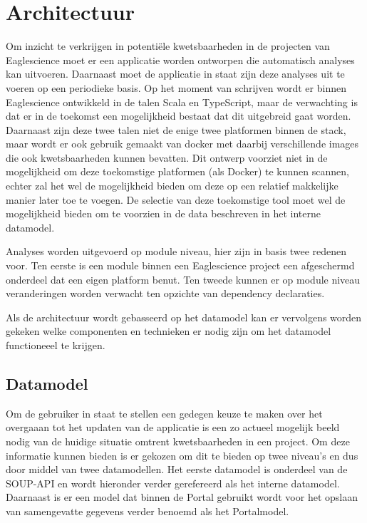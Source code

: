 \chapter{Architectuur}\label{ch:Architectuur}

Om inzicht te verkrijgen in potentiële kwetsbaarheden in de projecten van Eaglescience moet er een applicatie worden ontworpen die automatisch analyses kan uitvoeren. Daarnaast moet de applicatie in staat zijn deze analyses uit te voeren op een periodieke basis.
Op het moment van schrijven wordt er binnen Eaglescience ontwikkeld in de talen Scala en TypeScript, maar de verwachting is dat er in de toekomst een mogelijkheid bestaat dat dit uitgebreid gaat worden. Daarnaast zijn deze twee talen niet de enige twee platformen binnen de stack, maar wordt er ook gebruik gemaakt van docker met daarbij verschillende images die ook kwetsbaarheden kunnen bevatten. Dit ontwerp voorziet niet in de mogelijkheid om deze toekomstige platformen (als Docker) te kunnen scannen, echter zal het wel de mogelijkheid bieden om deze op een relatief makkelijke manier later toe te voegen. De selectie van deze toekomstige tool moet wel de mogelijkheid bieden om te voorzien in de data beschreven in het interne datamodel.

Analyses worden uitgevoerd op module niveau, hier zijn in basis twee redenen voor. Ten eerste is een module binnen een Eaglescience project een afgeschermd onderdeel dat een eigen platform benut. Ten tweede kunnen er op module niveau veranderingen worden verwacht ten opzichte van dependency declaraties.

Als de architectuur wordt gebasseerd op het datamodel kan er vervolgens worden gekeken welke componenten en technieken er nodig zijn om het datamodel functioneeel te krijgen.

\section{Datamodel}\label{sec:datamodel}
Om de gebruiker in staat te stellen een gedegen keuze te maken over het overgaaan tot het updaten van de applicatie is een zo actueel mogelijk beeld nodig van de huidige situatie omtrent kwetsbaarheden in een project. Om deze informatie kunnen bieden is er gekozen om dit te bieden op twee niveau's en dus door middel van twee datamodellen.
Het eerste datamodel is onderdeel van de SOUP-API en wordt hieronder verder gerefereerd als het interne datamodel. Daarnaast is er een model dat binnen de Portal gebruikt wordt voor het opslaan van samengevatte gegevens verder benoemd als het Portalmodel.


